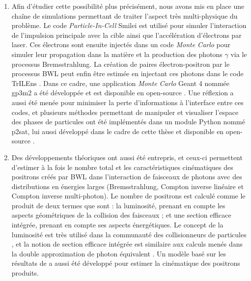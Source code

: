 \begin{refsection}
\begin{enumerate}
    \item Afin d'étudier cette possibilité plus précisément, nous avons mis en place une chaîne de simulations permettant de traiter l'aspect très multi-physique du problème. Le code \textit{Particle-In-Cell} Smilei \parencite{derouillat_2018} est utilisé pour simuler l'interaction de l'impulsion principale avec la cible ainsi que l'accélération d'électrons par laser. Ces électrons sont ensuite injectés dans un code \textit{Monte Carlo} pour simuler leur propagation dans la matière et la production des photons $\gamma$ via le processus Bremsstrahlung. La création de paires électron-positron par le processus BWL peut enfin être estimée en injectant ces photons dans le code TrILEns \parencite{jansen_2018}. Dans ce cadre, une application \textit{Monte Carlo} Geant 4 \parencite{agostinelli_2003} nommée gp3m2 a été développée et est disponible en open-source \parencite{gp3m2}. Une réflexion a aussi été menée pour minimiser la perte d'informations à l'interface entre ces codes, et plusieurs méthodes permettant de manipuler et visualiser l'espace des phases de particules ont été implémentés dans un module Python nommé p2sat, lui aussi développé dans le cadre de cette thèse et disponible en open-source \parencite{p2sat}.

    \item Des développements théoriques ont aussi été entrepris, et ceux-ci permettent d'estimer à la fois le nombre total et les caractéristiques cinématiques des positrons créés par BWL dans l'interaction de faisceaux de photons avec des distributions en énergies larges (Bremsstrahlung, Compton inverse linéaire et Compton inverse multi-photon). Le nombre de positrons est calculé comme le produit de deux termes que sont : la luminosité, prenant en compte les aspects géométriques de la collision des faisceaux ; et une section efficace intégrée, prenant en compte ses aspects énergétiques. Le concept de la luminosité est très utilisé dans la communauté des collisionneurs de particules \parencite{herr_2006}, et la notion de section efficace intégrée est similaire aux calculs menés dans la double approximation de photon équivalent \parencite{kessler_1974}. Un modèle basé sur les résultats de \cite{ribeyre_2017} a aussi été développé pour estimer la cinématique des positrons produits.


\end{enumerate}
\end{refsection}
